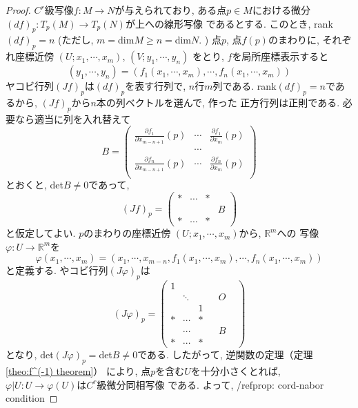 \documentclass[a4j,12pt]{jarticle}
\theoremstyle{definition}
\begin{document}
\begin{proof}
    $C^r$級写像$f:M\to N$が与えられており, 
    ある点$p\in M$における微分
    $(df)_p:T_p(M)\to T_p(N)$が上への線形写像
    であるとする. このとき, rank$(df)_p=n$
    (ただし, $m=$dim$M\geq n=$dim$N$. )
    点$p$, 点$f(p)$のまわりに, それぞれ座標近傍
    $(U;x_1,\cdots ,x_m)$, $(V;y_1,\cdots ,y_n)$
    をとり, $f$を局所座標表示すると
    $$(y_1, \cdots ,y_n)=(f_1(x_1,\cdots ,x_m), 
    \cdots ,f_n(x_1,\cdots ,x_m))$$
    ヤコビ行列$(Jf)_p$は$(df)_p$を表す行列で, 
    $n$行$m$列である. rank$(df)_p=n$であるから, 
    $(Jf)_p$から$n$本の列ベクトルを選んで, 作った
    正方行列は正則である. 必要なら適当に列を入れ替えて
    $$B=
    \begin{pmatrix}
        \frac{\partial f_1}{\partial x_{m-n+1}}(p) & \cdots & \frac{\partial f_1}{\partial x_m}(p)  \\
        &\cdots& \\
        \frac{\partial f_n}{\partial x_{m-n+1}}(p) & \cdots & \frac{\partial f_n}{\partial x_m}(p)  \\
    \end{pmatrix}
    $$
    とおくと, det$B \neq 0$であって, 
    $$(Jf)_p=
    \left(
        \begin{array}{ccc|c} 
          * & \cdots & *  &  \\
           &  &   & B \\
          * & \cdots & *  & 
        \end{array} 
        \right)
$$
と仮定してよい. $p$のまわりの座標近傍
$(U;x_1,\cdots ,x_m)$から, $\mathbb{R}^m$への
写像$\varphi :U\to \mathbb{R}^m$を
$$\varphi(x_1,\cdots ,x_m)=(x_1, \cdots ,x_{m-n},f_1(x_1,\cdots ,x_m), 
\cdots ,f_n(x_1,\cdots ,x_m))$$
と定義する. やコビ行列$(J\varphi)_p$は
$$(J\varphi)_p=
    \left(
        \begin{array}{ccc|ccc} 
          1 &        &   & & & \\
            & \ddots &   & &O& \\
            &        & 1 & & &  \\ \hline
          * & \cdots & * & & &  \\
            & \cdots &   & &B& \\
          * & \cdots & * & & &
        \end{array} 
        \right)
$$
となり, det$(J\varphi)_p=$det$B\neq 0$である. 
したがって, 逆関数の定理（定理
\ref{theo:f^(-1) theorem}）
により, 点$p$を含む$U$を十分小さくとれば, 
$\varphi |U:U\to \varphi(U)$は$C^r$級微分同相写像
である. よって, /ref{prop: cord-nabor condition}

\end{proof}
\end{document}
